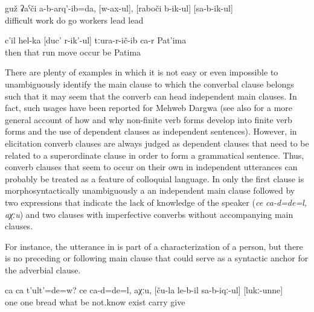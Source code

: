 \begin{enumerate}
\begin{exe}
		\ex	\label{ex:I did not do a difficult work, driving, bringing the workers (to the wine factory) and bringing them back}
		\gll	guž	ʡaˁči	a-b-arq'-ib=da,	[w-ax-ul],	[raboči	b-ik-ul]	[sa-b-ik-ul]\\
			difficult	work	do	go workers	lead	lead\\
		\glt	{}
	
		\ex	\label{ex:Then Patima appeared outside running}
		\gll	c'il	hel-ka	[duc'	r-ik'-ul]	tːura-r-ič-ib	ca-r	Pat'ima\\
			then	that	run	move	occur	be	Patima\\
		\glt	{}
	\end{exe}
	
There are plenty of examples in which it is not easy or even impossible to unambiguously identify the main clause to which the converbal clause belongs such that it may seem that the converb can head independent main clauses. In fact, such usages have been reported for Mehweb Dargwa \citep{Kustova2015} (see also \citet{Mithun2008} for a more general account of how and why non-finite verb forms develop into finite verb forms and the use of dependent clauses as independent sentences). However, in elicitation converb clauses are always judged as dependent clauses that need to be related to a superordinate clause in order to form a grammatical sentence. Thus, converb clauses that seem to occur on their own in independent utterances can probably be treated as a feature of colloquial language. In  only the first clause is morphosyntactically unambiguously a an independent main clause followed by two expressions that indicate the lack of knowledge of the speaker (\textit{ce ca-d=de=l, aχːu}) and two clauses with imperfective converbs without accompanying main clauses.

For instance, the utterance in  is part of a characterization of a person, but there is no preceding or following main clause that could serve as a syntactic anchor for the adverbial clause.
	\begin{exe}
		\ex	\label{ex:‎There was bread one for everyone, whatever}
		\gll	ca	ca	t'ult'=de=w?	ce	ca-d=de=l,	aχːu,	[ču-la	le-b-il	sa-b-iqː-ul]	[lukː-unne]\\
			one	one	bread	what	be	not.know		exist	carry\tsc{.ipfv-icvb}	give\\
		\glt	{}
	

\end{exe}
\end{enumerate}
